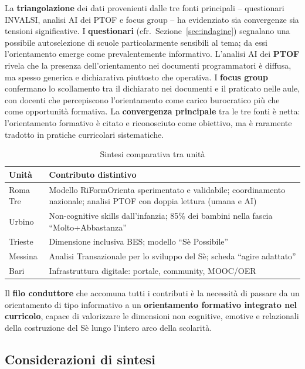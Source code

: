 \documentclass[12pt,a4paper]{article}
\begin{document}
La \textbf{triangolazione} dei dati provenienti dalle tre fonti principali -- questionari INVALSI, analisi AI dei PTOF e focus group -- ha evidenziato sia convergenze sia tensioni significative. I \textbf{questionari} (cfr.\ Sezione~\ref{sec:indagine}) segnalano una possibile autoselezione di scuole particolarmente sensibili al tema; da essi l'orientamento emerge come prevalentemente informativo. L'analisi AI dei \textbf{PTOF} rivela che la presenza dell'orientamento nei documenti programmatori \`e diffusa, ma spesso generica e dichiarativa piuttosto che operativa. I \textbf{focus group} confermano lo scollamento tra il dichiarato nei documenti e il praticato nelle aule, con docenti che percepiscono l'orientamento come carico burocratico pi\`u che come opportunit\`a formativa. La \textbf{convergenza principale} tra le tre fonti \`e netta: l'orientamento formativo \`e citato e riconosciuto come obiettivo, ma \`e raramente tradotto in pratiche curricolari sistematiche.

\begin{table}[h]
\centering
\caption{Sintesi comparativa tra unit\`a}
\label{tab:confronto_unita}
\begin{tabularx}{\textwidth}{lX}
\toprule
\textbf{Unit\`a} & \textbf{Contributo distintivo} \\
\midrule
Roma Tre & Modello RiFormOrienta sperimentato e validabile; coordinamento nazionale; analisi PTOF con doppia lettura (umana e AI) \\
Urbino & Non-cognitive skills dall'infanzia; 85\% dei bambini nella fascia ``Molto+Abbastanza'' \\
Trieste & Dimensione inclusiva BES; modello ``S\`e Possibile'' \\
Messina & Analisi Transazionale per lo sviluppo del S\`e; scheda ``agire adattato'' \\
Bari & Infrastruttura digitale: portale, community, MOOC/OER \\
\bottomrule
\end{tabularx}
\end{table}

Il \textbf{filo conduttore} che accomuna tutti i contributi \`e la necessit\`a di passare da un orientamento di tipo informativo a un \textbf{orientamento formativo integrato nel curricolo}, capace di valorizzare le dimensioni non cognitive, emotive e relazionali della costruzione del S\`e lungo l'intero arco della scolarit\`a.

\subsection{Considerazioni di sintesi}
\end{document}
